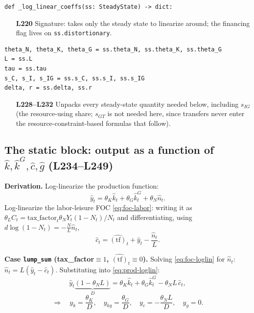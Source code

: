 \documentclass[11pt]{article}
\newcommand{\eq}[1]{\begin{equation}#1\end{equation}}
\begin{document}
\begin{lstlisting}[firstnumber=220]
def _log_linear_coeffs(ss: SteadyState) -> dict:
\end{lstlisting}
\begin{itemize}
\item[\textbf{L220}] Signature: takes only the steady state to linearize
around; the financing flag lives on \texttt{ss.distortionary}.
\end{itemize}

\begin{lstlisting}[firstnumber=228]
theta_N, theta_K, theta_G = ss.theta_N, ss.theta_K, ss.theta_G
L = ss.L
tau = ss.tau
s_C, s_I, s_IG = ss.s_C, ss.s_I, ss.s_IG
delta, r = ss.delta, ss.r
\end{lstlisting}
\begin{itemize}
\item[\textbf{L228--L232}] Unpacks every steady-state quantity needed
below, including $s_{IG}$ (the resource-using share; $s_{GT}$ is not
needed here, since transfers never enter the resource-constraint-based
formulas that follow).
\end{itemize}

\subsection{The static block: output as a function of \texorpdfstring{$\hat k,\hat k^G,\hat c,\hat g$}{k,kG,c,g} (L234--L249)}

\textbf{Derivation.} Log-linearize the production function:
\eq{ \hat y_t = \theta_K\hat k_t+\theta_G\hat k^G_t+\theta_N\hat n_t. \label{eq:prod-loglin} }
Log-linearize the labor-leisure FOC \eqref{eq:foc-labor}: writing it as
$\theta_L C_t=\text{tax\_factor}_t\theta_N Y_t(1-N_t)/N_t$ and
differentiating, using $d\log(1-N_t)=-\frac{N}{L}\hat n_t$,
\eq{ \hat c_t = \widehat{(\text{tf})}_t+\hat y_t-\frac{\hat n_t}{L}. \label{eq:foc-loglin}}

\textbf{Case \texttt{lump\_sum} (tax\_factor$\equiv1$, $\widehat{(\text{tf})}_t\equiv0$).}
Solving \eqref{eq:foc-loglin} for $\hat n_t$: $\hat n_t=L(\hat y_t-\hat c_t)$.
Substituting into \eqref{eq:prod-loglin}:
\eq{ \hat y_t\underbrace{(1-\theta_N L)}_{\displaystyle D}
       = \theta_K\hat k_t+\theta_G\hat k^G_t-\theta_N L\,\hat c_t, }
\eq{ \Longrightarrow\quad y_k=\frac{\theta_K}{D}, \quad y_{kg}=\frac{\theta_G}{D}, \quad y_c=-\frac{\theta_N L}{D}, \quad y_g=0. \label{eq:static-lump}}
\end{document}
